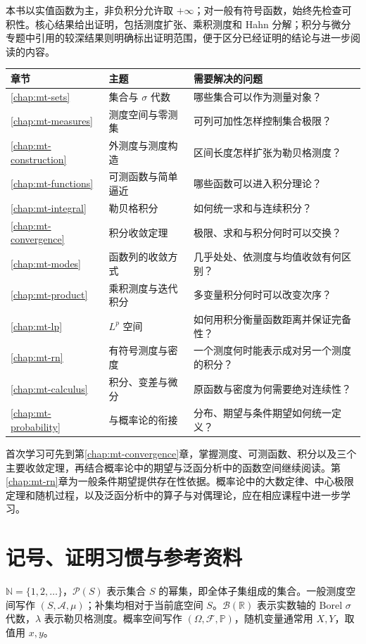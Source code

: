 \documentclass[UTF8,12pt,a4paper,fontset=fandol]{ctexbook}
\begin{document}
本书以实值函数为主，非负积分允许取 $+\infty$；对一般有符号函数，始终先检查可积性。核心结果给出证明，包括测度扩张、乘积测度和 Hahn 分解；积分与微分专题中引用的较深结果则明确标出证明范围，便于区分已经证明的结论与进一步阅读的内容。

\begin{longtable}{L{0.10\textwidth}L{0.30\textwidth}L{0.48\textwidth}}
\toprule
章节 & 主题 & 需要解决的问题\\
\midrule
\endhead
\ref{chap:mt-sets} & 集合与 $\sigma$ 代数 & 哪些集合可以作为测量对象？\\
\ref{chap:mt-measures} & 测度空间与零测集 & 可列可加性怎样控制集合极限？\\
\ref{chap:mt-construction} & 外测度与测度构造 & 区间长度怎样扩张为勒贝格测度？\\
\ref{chap:mt-functions} & 可测函数与简单逼近 & 哪些函数可以进入积分理论？\\
\ref{chap:mt-integral} & 勒贝格积分 & 如何统一求和与连续积分？\\
\ref{chap:mt-convergence} & 积分收敛定理 & 极限、求和与积分何时可以交换？\\
\ref{chap:mt-modes} & 函数列的收敛方式 & 几乎处处、依测度与均值收敛有何区别？\\
\ref{chap:mt-product} & 乘积测度与迭代积分 & 多变量积分何时可以改变次序？\\
\ref{chap:mt-lp} & $L^p$ 空间 & 如何用积分衡量函数距离并保证完备性？\\
\ref{chap:mt-rn} & 有符号测度与密度 & 一个测度何时能表示成对另一个测度的积分？\\
\ref{chap:mt-calculus} & 积分、变差与微分 & 原函数与密度为何需要绝对连续性？\\
\ref{chap:mt-probability} & 与概率论的衔接 & 分布、期望与条件期望如何统一定义？\\
\bottomrule
\end{longtable}

首次学习可先到第\ref{chap:mt-convergence}章，掌握测度、可测函数、积分以及三个主要收敛定理，再结合概率论中的期望与泛函分析中的函数空间继续阅读。第\ref{chap:mt-rn}章为一般条件期望提供存在性依据。概率论中的大数定律、中心极限定理和随机过程，以及泛函分析中的算子与对偶理论，应在相应课程中进一步学习。

\section{记号、证明习惯与参考资料}
$\mathbb N=\{1,2,\ldots\}$，$\mathcal P(S)$ 表示集合 $S$ 的幂集，即全体子集组成的集合。一般测度空间写作 $(S,\mathcal A,\mu)$；补集均相对于当前底空间 $S$。$\mathcal B(\mathbb R)$ 表示实数轴的 Borel $\sigma$ 代数，$\lambda$ 表示勒贝格测度。概率空间写作 $(\Omega,\mathcal F,\mathbb P)$，随机变量通常用 $X,Y$，取值用 $x,y$。
\end{document}
